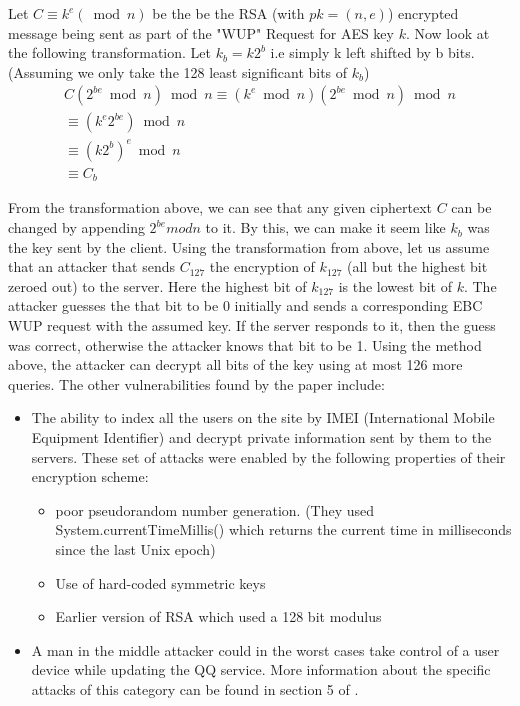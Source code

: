 \indent Let $ C \equiv k^e ( \bmod n )  $  be the be the RSA (with $pk = (n,e)$)  encrypted message being sent as part of the "WUP" Request for AES key $ k $. Now look at the following transformation. \newline
Let $k_b = k2^b$ i.e simply k left shifted by b bits. (Assuming we only take the 128 least significant bits of $k_b$)
\begin{align*}
C(2^{be} \bmod n) \bmod n \equiv (k^e \bmod n) (2^{be} \bmod n) \bmod n \\
					  \equiv (k^e2^{be}) \bmod n\\
					  \equiv (k2^b)^e \bmod n\\
					  \equiv C_b
\end{align*}

From the transformation above, we can see that any given ciphertext $C$ can be changed by appending $2^{be} mod n$ to it. By this, we can make it seem like $k_b$ was the key sent by the client.\newline
\indent Using the transformation from above, let us assume that an attacker that sends $C_{127}$ the encryption of $k_{127}$ (all but the highest bit zeroed out) to the server. Here the highest bit of $k_{127}$ is the lowest bit of $k$. The attacker guesses the that bit to be 0 initially and sends a corresponding EBC WUP request  with the assumed key. If the server responds to it, then the guess was correct, otherwise the attacker knows that bit to be 1. \newline
\indent Using the method above, the attacker can decrypt all bits of the key using at most 126 more queries.\newline  
\indent The other vulnerabilities found by the \cite{QQAttack} paper include:
\begin{itemize}
	\item The ability to index all the users on the site by IMEI  (International Mobile Equipment Identifier) and decrypt private information sent by them to the servers. These set of attacks were enabled by the following properties of their encryption scheme:
	\begin{itemize}
		\item poor pseudorandom number generation. (They used System.currentTimeMillis() which returns the current time in milliseconds since the last Unix epoch)
		\item Use of hard-coded symmetric keys
		\item Earlier version of RSA which used a 128 bit modulus
	\end{itemize}
	\item A man in the middle attacker could in the worst cases take control of a user device while updating the QQ service. More information about the specific attacks of this category can be found in section 5 of \cite{QQAttack}. 
\end{itemize}

